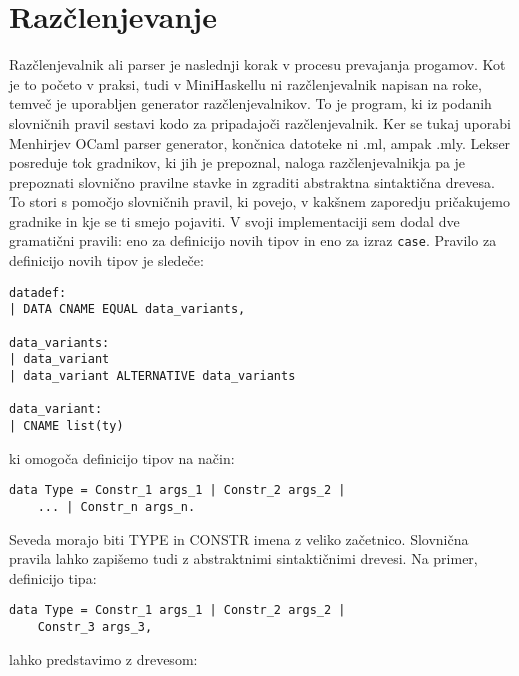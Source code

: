 \documentclass[12pt,a4paper,openany]{book}
\begin{document}
\section{Razčlenjevanje}
Razčlenjevalnik ali parser je naslednji korak v procesu prevajanja progamov. Kot je to početo v praksi, tudi v MiniHaskellu ni razčlenjevalnik napisan na roke, temveč 
je uporabljen generator razčlenjevalnikov. To je program, ki iz podanih slovničnih pravil sestavi kodo za pripadajoči razčlenjevalnik. Ker se tukaj uporabi Menhirjev OCaml parser generator, končnica 
datoteke ni .ml, ampak .mly. Lekser posreduje tok gradnikov, ki jih je prepoznal, naloga razčlenjevalnikja pa je prepoznati slovnično pravilne stavke in zgraditi 
abstraktna sintaktična drevesa. To stori s pomočjo slovničnih pravil, ki povejo, v kakšnem zaporedju pričakujemo gradnike in kje se ti smejo pojaviti. 
V svoji implementaciji sem dodal dve gramatični pravili: eno za definicijo novih tipov in eno za izraz \lstinline{case}. Pravilo za definicijo novih tipov je 
sledeče:
\begin{lstlisting}
datadef:
| DATA CNAME EQUAL data_variants,

data_variants:
| data_variant
| data_variant ALTERNATIVE data_variants

data_variant:
| CNAME list(ty)
\end{lstlisting}
ki omogoča definicijo tipov na način:
\begin{lstlisting}
data Type = Constr_1 args_1 | Constr_2 args_2 | 
    ... | Constr_n args_n.
\end{lstlisting}
Seveda morajo biti TYPE in CONSTR imena z veliko začetnico. Slovnična pravila lahko zapišemo tudi z abstraktnimi sintaktičnimi drevesi. Na primer, 
definicijo tipa:
\begin{lstlisting}
data Type = Constr_1 args_1 | Constr_2 args_2 | 
    Constr_3 args_3,
\end{lstlisting}
lahko predstavimo z drevesom:
\begin{center}
\end{center}
\end{document}
